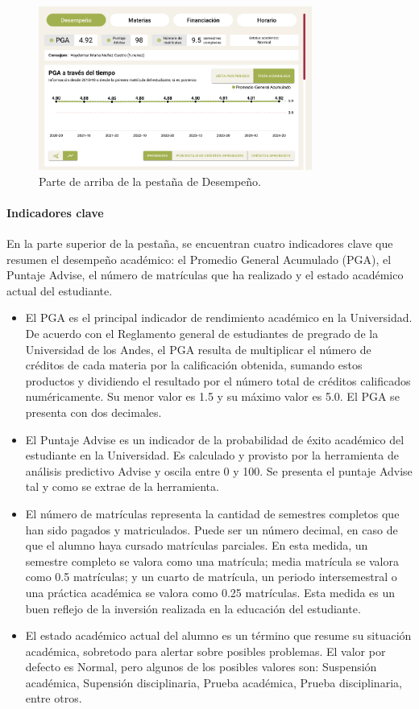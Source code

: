 \begin{figure}[H]
	\centering
	\includegraphics[width=0.8\textwidth]{assets/nes/desempeno_1.png}
	\caption{Parte de arriba de la pestaña de Desempeño.}
	\label{fig:desempeno}
\end{figure}

\paragraph{Indicadores clave} En la parte superior de la pestaña, se encuentran cuatro indicadores clave que resumen el desempeño académico: el Promedio General Acumulado (PGA), el Puntaje Advise, el número de matrículas que ha realizado y el estado académico actual del estudiante.
\begin{itemize}
	\item El PGA es el principal indicador de rendimiento académico en la Universidad. De acuerdo con el Reglamento general de estudiantes de pregrado de la Universidad de los Andes, el PGA resulta de multiplicar el número de créditos de cada materia por la calificación obtenida, sumando estos productos y dividiendo el resultado por el número total de créditos calificados numéricamente.
	      Su menor valor es 1.5 y su máximo valor es 5.0. El PGA se presenta con dos decimales.
	\item El Puntaje Advise es un indicador de la probabilidad de éxito académico del estudiante en la Universidad. Es calculado y provisto por la herramienta de análisis predictivo Advise y oscila entre 0 y 100. Se presenta el puntaje Advise tal y como se extrae de la herramienta.
	\item El número de matrículas representa la cantidad de semestres completos que han sido pagados y matriculados. Puede ser un número decimal, en caso de que el alumno haya cursado matrículas parciales. En esta medida, un semestre completo se valora como una matrícula; media matrícula se valora como 0.5 matrículas; y un cuarto de matrícula, un periodo intersemestral o una práctica académica se valora como 0.25 matrículas. Esta medida es un buen reflejo de la inversión realizada en la educación del estudiante.
	\item El estado académico actual del alumno es un término que resume su situación académica, sobretodo para alertar sobre posibles problemas. El valor por defecto es Normal, pero algunos de los posibles valores son: Suspensión académica, Supensión disciplinaria, Prueba académica, Prueba disciplinaria, entre otros.
\end{itemize}

